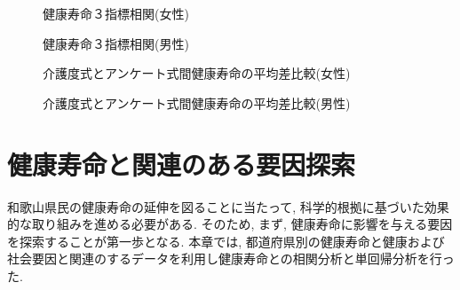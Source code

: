\begin{figure}[h!]
	\begin{center}
		\caption{健康寿命３指標相関(女性)}
	\end{center}
\end{figure}



\begin{figure}[h!]
	\begin{center}
		\caption{健康寿命３指標相関(男性)}
	\end{center}
\end{figure}

\begin{figure}[h!]
	\begin{center}
		\caption{介護度式とアンケート式間健康寿命の平均差比較(女性)}
	\end{center}
\end{figure}

\begin{figure}[h!]
	\begin{center}
		\caption{介護度式とアンケート式間健康寿命の平均差比較(男性)}
	\end{center}
\end{figure}




\chapter{健康寿命と関連のある要因探索}

和歌山県民の健康寿命の延伸を図ることに当たって, 科学的根拠に基づいた効果的な取り組みを進める必要がある. そのため, まず, 健康寿命に影響を与える要因を探索することが第一歩となる.
本章では, 都道府県別の健康寿命と健康および社会要因と関連のするデータを利用し健康寿命との相関分析と単回帰分析を行った.

